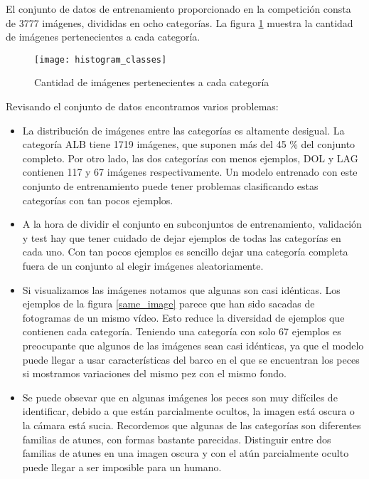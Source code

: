 El conjunto de datos de entrenamiento proporcionado en la competición consta de
3777 imágenes, divididas en ocho categorías. La figura \ref{histogram} muestra
la cantidad de imágenes pertenecientes a cada categoría.

\begin{figure}
  \centering
  \caption{Cantidad de imágenes pertenecientes a cada categoría}
\label{histogram}
  \texttt{[image: histogram\_classes]}
\end{figure}

Revisando el conjunto de datos encontramos varios problemas:

\begin{itemize}
\label{problems}
    \item{La distribución de imágenes entre las categorías es altamente desigual. La
categoría ALB tiene 1719 imágenes, que suponen más del 45 \% del conjunto
completo. Por otro lado, las dos categorías con menos ejemplos, DOL y LAG
contienen 117 y 67 imágenes respectivamente. Un modelo entrenado con este
conjunto de entrenamiento puede tener problemas clasificando estas categorías
con tan pocos ejemplos.}

\item{A la hora de dividir el conjunto en subconjuntos de entrenamiento, validación y
test hay que tener cuidado de dejar ejemplos de todas las categorías en cada
uno. Con tan pocos ejemplos es sencillo dejar una categoría completa fuera de un
conjunto al elegir imágenes aleatoriamente.}

\item{Si visualizamos las imágenes notamos que algunas son casi idénticas. Los
ejemplos de la figura \ref{same_image} parece que han sido sacadas de fotogramas
de un mismo vídeo. Esto reduce la diversidad de ejemplos que contienen cada
categoría. Teniendo una categoría con solo 67 ejemplos es preocupante que
algunos de las imágenes sean casi idénticas, ya que el modelo puede llegar a
usar características del barco en el que se encuentran los peces si mostramos
variaciones del mismo pez con el mismo fondo.}

\item{Se puede obsevar que en algunas imágenes los peces son muy difíciles de
        identificar, debido a que están parcialmente ocultos, la imagen está
        oscura o la cámara está sucia. Recordemos que algunas de las categorías
        son diferentes familias de atunes, con formas bastante parecidas.
    Distinguir entre dos familias de atunes en una imagen oscura y con el atún
parcialmente oculto puede llegar a ser imposible para un humano.}


\end{itemize}

